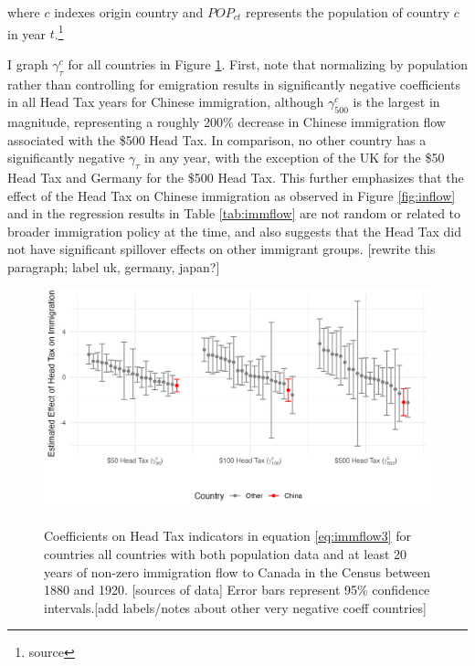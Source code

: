 where $c$ indexes origin country and $POP_{ct}$ represents the population of country $c$ in year $t$.\footnote{source}

I graph $\gamma^c_{\tau}$ for all countries in Figure \ref{fig:gammac}. First, note that normalizing by population rather than controlling for emigration results in significantly negative coefficients in all Head Tax years for Chinese immigration, although $\gamma_{500}^c$ is the largest in magnitude, representing a roughly 200\% decrease in Chinese immigration flow associated with the \$500 Head Tax. In comparison, no other country has a significantly negative $\gamma_{\tau}$ in any year, with the exception of the UK for the \$50 Head Tax and Germany for the \$500 Head Tax. This further emphasizes that the effect of the Head Tax on Chinese immigration as observed in Figure \ref{fig:inflow} and in the regression results in Table \ref{tab:immflow} are not random or related to broader immigration policy at the time, and also suggests that the Head Tax did not have significant spillover effects on other immigrant groups. [rewrite this paragraph; label uk, germany, japan?] 

\begin{figure}[h!]
    \centering 
    \caption{Coefficients on Head Tax indicators in equation \ref{eq:immflow3} for countries all countries with both population data and at least 20 years of non-zero immigration flow to Canada in the Census between 1880 and 1920. [sources of data] Error bars represent 95\% confidence intervals.[add labels/notes about other very negative coeff countries]}
    \includegraphics[width=\textwidth]{../../figs/immflow_countries.png}
    \label{fig:gammac}
\end{figure}
